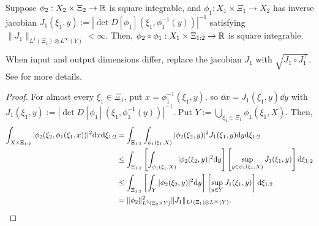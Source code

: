 \begin{lemma}
    Suppose $\phi_2 : X_2 \times \Xi_2 \to \mathbb{R}$ is square integrable, and $\phi_1 : X_1 \times \Xi_1 \to X_2$ has inverse jacobian $J_1(\xi_1,y) := |\det D[\phi_1](\xi_1,\phi_1^{-1}(y))|^{-1}$ satisfying $\| J_1 \|_{L^1(\Xi_1) \otimes L^\infty(Y)} < \infty$. Then, $\phi_2 \circ \phi_1 : X_1 \times \Xi_{1:2} \to \mathbb{R}$ is square integrable.
\end{lemma}
\begin{remark}
When input and output dimensions differ, replace the jacobian $J_1$ with $\sqrt{J_1 \circ J_1^\top}$. See \citet{Evans2015} for more details.
\end{remark}
\begin{proof}
    For almost every $\xi_1 \in \Xi_1$, put $x = \phi_1^{-1}(\xi_1,y)$, 
    so $\dd x = J_1(\xi_1,y) \dd y$ with $J_1(\xi_1,y) := |\det D[\phi_1](\xi_1,\phi_1^{-1}(y))|^{-1}$.
    Put $Y := \bigcup_{\xi_1 \in \Xi_1} \phi_1(\xi_1, X)$.
    Then,
    \begin{align*}
        \int_{X \times \Xi_{1:2}} | \phi_2( \xi_2, \phi_1( \xi_1, x ) ) |^2 \mathrm{d} x \mathrm{d} \xi_{1:2}
        &=\int_{\Xi_{1:2}} \int_{\phi_1(\xi_1,X)} | \phi_2( \xi_2, y ) |^2 J_1(\xi_1,y) \mathrm{d} y \mathrm{d} \xi_{1:2}\\
        &\le \int_{\Xi_{1:2}} \left[\int_{\phi_1(\xi_1,X)} | \phi_2( \xi_2, y ) |^2 \mathrm{d} y \right] \left[ \sup_{y \in \phi_1(\xi_1,X)} J_1(\xi_1,y) \right] \mathrm{d} \xi_{1:2}\\
        &\le \int_{\Xi_{1:2}} \left[\int_Y | \phi_2( \xi_2, y ) |^2 \mathrm{d} y \right] \left[ \sup_{y \in Y} J_1(\xi_1,y) \right] \mathrm{d} \xi_{1:2}\\
        &= \| \phi_2 \|_{L^2(\Xi_2 \times Y)}^2 \| J_1 \|_{L^1(\Xi_1) \otimes L^\infty(Y)}. \qedhere
    \end{align*}
\end{proof}
